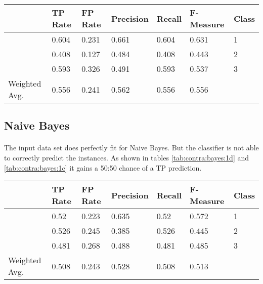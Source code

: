 \documentclass[paper=a4, fontsize=11pt]{scrartcl} %
\numberwithin{equation}{section} %
\numberwithin{figure}{section} %
\numberwithin{table}{section} %
\begin{document}
\begin{table*}[htb]\centering
  \begin{tabular*}{\columnwidth}{@{}lllllll@{}}
      \toprule 
               &  TP Rate & FP Rate & Precision & Recall & F-Measure &  Class \\  \midrule     
               &  0.604   & 0.231   & 0.661     & 0.604  & 0.631     &  1     \\  
               &  0.408   & 0.127   & 0.484     & 0.408  & 0.443     &  2     \\  
               &  0.593   & 0.326   & 0.491     & 0.593  & 0.537     &  3     \\  
Weighted Avg.  &  0.556   & 0.241   & 0.562     & 0.556  & 0.556     &        \\  \bottomrule 
    \end{tabular*}
\caption{Random Forests on Contraceptive Data Set -- with at least 6 chosen features} 
\label{tab:contra:rand:6f}
\end{table*}
\FloatBarrier


\subsection{Naive Bayes}

\paragraph{}The input data set does perfectly fit for Naive Bayes. But the classifier is not able to correctly predict the instances. As shown in tables \ref{tab:contra:bayes:1d} and \ref{tab:contra:bayes:1c} it gains a 50:50 chance of a TP prediction.


\begin{table*}[htb]\centering
  \begin{tabular*}{\columnwidth}{@{}lllllll@{}}
      \toprule 
               &  TP Rate & FP Rate & Precision & Recall & F-Measure & Class \\   \midrule
               &  0.52    & 0.223   & 0.635     & 0.52   & 0.572     & 1  \\  
               &  0.526   & 0.245   & 0.385     & 0.526  & 0.445     & 2  \\
               &  0.481   & 0.268   & 0.488     & 0.481  & 0.485     & 3  \\
Weighted Avg.  &  0.508   & 0.243   & 0.528     & 0.508  & 0.513     &    \\   \bottomrule
    \end{tabular*}
\caption{Naive Bayes} 
\label{tab:contra:bayes:1d}
\end{table*}
\end{document}
